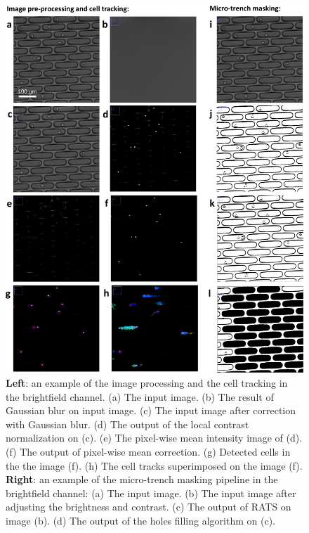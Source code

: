 \documentclass[pdftex,12pt,a4paper]{report}
\begin{document}
\begin{figure}[p]
   \centering
    \includegraphics[width=.9\textwidth]{images/pipeline/01-02.pdf}
    \caption[Example of the brightfield channel pipeline]{\textbf{Left}: an example of the image processing and the cell tracking in the brightfield channel. (a) The input image. (b) The result of Gaussian blur on input image. (c) The input image after correction with Gaussian blur. (d) The output of the local contrast normalization on (c). (e) The pixel-wise mean intensity image of (d). (f) The output of pixel-wise mean correction. (g) Detected cells in the the image (f). (h) The cell tracks superimposed on the image (f). \textbf{Right}: an example of the micro-trench masking pipeline in the brightfield channel: (a) The input image. (b) The input image after adjusting the brightness and contrast. (c) The output of RATS on image (b). (d) The output of the holes filling algorithm on (c).}
\end{figure}
\label{fig:pipeline12}

\end{document}
